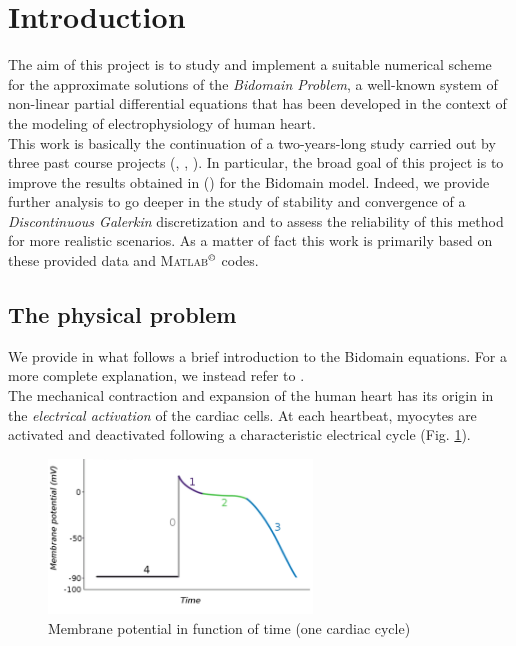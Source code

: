 \documentclass[a4paper,11pt]{article}
\begin{document}
    \section{Introduction}
    The aim of this project is to study and implement a suitable numerical scheme for the approximate solutions of the \emph{Bidomain Problem}, a well-known system of non-linear partial differential equations that has been developed in the context of the modeling of electrophysiology of human heart. \\
    This work is basically the continuation of a two-years-long study carried out by three past course projects (\cite{bagnara}, \cite{andreotti}, \cite{marta}). In particular, the broad goal of this project is to improve the results obtained in \parencite{marta} (\citeauthor{marta}) for the Bidomain model. Indeed, we provide further analysis to go deeper in the study of stability and convergence of a \emph{Discontinuous Galerkin} discretization and to assess the reliability of this method for more realistic scenarios. As a matter of fact this work is primarily based on these provided data and \textsc{Matlab}$^ \copyright$ codes.
    
    \subsection{The physical problem}
    We provide in what follows a brief introduction to the Bidomain equations. For a more complete explanation, we instead refer to \cite{acta}.\\
    The mechanical contraction and expansion of the human heart has its origin in the \emph{electrical activation} of the cardiac cells. At each heartbeat, myocytes are activated and deactivated following a characteristic electrical cycle (Fig. \ref{potential_cycle}). 
    
    
    \begin{figure}[h]
    \begin{center}
    \includegraphics[width = 7cm]{./potential_cycle.png}
    \caption{Membrane potential in function of time (one cardiac cycle)}
    \label{potential_cycle}
    \end{center}
    \end{figure}
    
\end{document}

